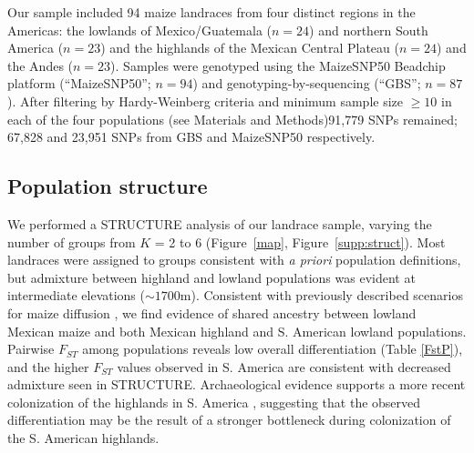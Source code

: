 Our sample included 94 maize landraces from four distinct regions in the Americas: the lowlands of Mexico/Guatemala ($n=24$) and northern South America ($n=23$) and the highlands of the Mexican Central Plateau ($n=24$) and the Andes ($n=23$). 
Samples were genotyped using the MaizeSNP50 Beadchip platform (``MaizeSNP50''; $n=94$) and genotyping-by-sequencing (``GBS''; $n=87$). 
After filtering by Hardy-Weinberg criteria and minimum sample size $\geq10$ in each of the four populations (see Materials and Methods)91,779 SNPs remained; 67,828 and 23,951 SNPs from GBS and MaizeSNP50 respectively.  

\subsection*{Population structure}

We performed a {\sf STRUCTURE} analysis \cite[]{Pritchard_2000_10835412,Falush_2003_12930761} of our landrace sample, varying the number of groups from $K$ = 2 to 6 (Figure~\ref{map}, Figure~\ref{supp:struct}). 
Most landraces were assigned to groups consistent with \emph{a priori} population definitions, but admixture between highland and lowland populations was evident at intermediate elevations ($\sim1700$m).  Consistent with previously described scenarios for maize diffusion \cite[]{Piperno_2006_69}, we find evidence of shared ancestry between lowland Mexican maize and both Mexican highland and S. American lowland populations.  Pairwise $F_{ST}$ among populations reveals low overall differentiation (Table \ref{FstP}), and the higher $F_{ST}$ values observed in S. America are consistent with decreased admixture seen in STRUCTURE.  Archaeological evidence supports a more recent colonization of the highlands in S. America  \cite[]{Piperno_2006_69,Perry_2006_16511492,Grobman_2012_22307642}, suggesting that the observed differentiation may be the result of a stronger bottleneck during colonization of the S. American highlands. 


